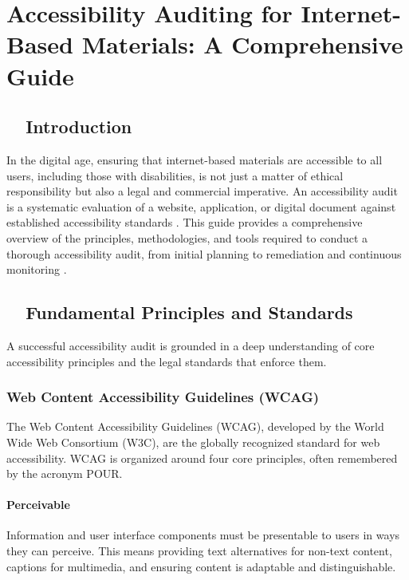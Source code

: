 \chapter{Accessibility Auditing for Internet-Based Materials: A Comprehensive Guide}
\label{chap:accessibility-auditing}

\section{~~Introduction}
\label{sec:intro-auditing}
In the digital age, ensuring that internet-based materials are accessible to all users, including those with disabilities, is not just a matter of ethical responsibility but also a legal and commercial imperative. An accessibility audit is a systematic evaluation of a website, application, or digital document against established accessibility standards \supercite{DisabilityRightsAuditing}. This guide provides a comprehensive overview of the principles, methodologies, and tools required to conduct a thorough accessibility audit, from initial planning to remediation and continuous monitoring \supercite{Lazar2015}.

\section{~~Fundamental Principles and Standards}
\label{sec:principles-standards}
A successful accessibility audit is grounded in a deep understanding of core accessibility principles and the legal standards that enforce them.

\subsection{Web Content Accessibility Guidelines (WCAG)}
\label{subsec:wcag}
The Web Content Accessibility Guidelines (WCAG), developed by the World Wide Web Consortium (W3C), are the globally recognized standard for web accessibility. WCAG is organized around four core principles, often remembered by the acronym POUR.
\supercite{WCAG21, WCAG2018}

\subsubsection{Perceivable}
\label{ssubsec:perceivable}
Information and user interface components must be presentable to users in ways they can perceive. This means providing text alternatives for non-text content, captions for multimedia, and ensuring content is adaptable and distinguishable.
\supercite{WCAGNonText2018}


